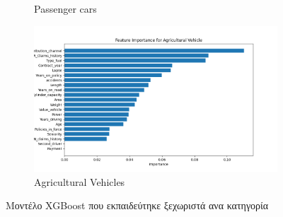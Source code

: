 \documentclass{llncs}
\begin{document}
\begin{figure}
\begin{subfigure}{0.45\linewidth}
       \caption{Passenger cars}
       \label{fig:subxgb3}
        \end{subfigure}
         \begin{subfigure}{0.45\linewidth}
        \includegraphics[width=\linewidth]{images/Agricultural Vehicle_feature_importance_xgb.png}
        \caption{Agricultural Vehicles}
        \label{fig:subxgb4}
         \end{subfigure}
  \caption{Μοντέλο XGBoost που εκπαιδεύτηκε ξεχωριστά ανα κατηγορία}
  \label{fig:xgb_split_importance}
\end{figure}
\end{document}
